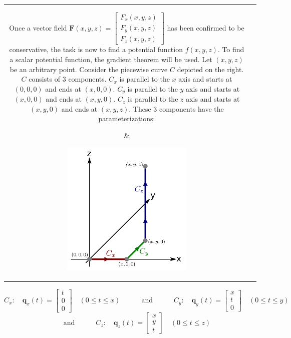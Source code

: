 \documentclass{article}
\begin{document}
\vspace{5mm}

\begin{tabular}{cc}
\parbox{0.5\textwidth}{
Once a vector field \(\mathbf{F}(x,y,z) = \begin{bmatrix} F_x(x,y,z) \\ F_y(x,y,z) \\ F_z(x,y,z) \end{bmatrix}\) has been confirmed to be conservative, the task is now to find a potential function \(f(x,y,z)\). To find a scalar potential function, the gradient theorem will be used. Let \((x,y,z)\) be an arbitrary point. Consider the piecewise curve \(C\) depicted on the right. \(C\) consists of 3 components. \(C_x\) is parallel to the \(x\) axis and starts at \((0, 0, 0)\) and ends at \((x, 0, 0)\). \(C_y\) is parallel to the \(y\) axis and starts at \((x, 0, 0)\) and ends at \((x, y, 0)\). \(C_z\) is parallel to the \(z\) axis and starts at \((x, y, 0)\) and ends at \((x, y, z)\). These 3 components have the parameterizations: 
} & \parbox{0.5\textwidth}{
\includegraphics[width = 0.5\textwidth]{finding_the_scalar_potential}
}
\end{tabular}

\[C_x: \quad \mathbf{q}_{x}(t) = \begin{bmatrix} t \\ 0 \\ 0 \end{bmatrix} \quad (0 \leq t \leq x) 
\quad \quad\quad\text{and}\quad\quad\quad   
C_y: \quad \mathbf{q}_{y}(t) = \begin{bmatrix} x \\ t \\ 0 \end{bmatrix} \quad (0 \leq t \leq y)\]
\[\quad\quad\text{and}\quad\quad\quad   
C_z: \quad \mathbf{q}_{z}(t) = \begin{bmatrix} x \\ y \\ t \end{bmatrix} \quad (0 \leq t \leq z)\]
\end{document}

